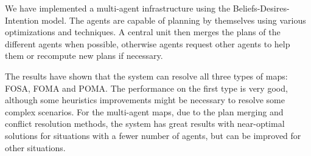 We have implemented a multi-agent infrastructure using the Beliefs-Desires-Intention model. The agents are
capable of planning by themselves using various optimizations and techniques. A central unit then merges the
plans of the different agents when possible, otherwise agents request other agents to help them or recompute
new plans if necessary.

The results have shown that the system can resolve all three types of maps: FOSA, FOMA and POMA. The
performance on the first type is very good, although some heuristics improvements might be necessary to
resolve some complex scenarios. For the multi-agent maps, due to the plan merging and conflict resolution
methods, the system has great results with near-optimal solutions for situations with a fewer number of
agents, but can be improved for other situations.